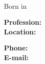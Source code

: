 \documentclass{./../lib/resume}
\begin{document}
\iftoggle{Dev}{\par}{}
\noindent\parbox{57mm}
{\parbox{57mm}{\raggedright\Huge\bfseries\color{cyan}\fullName}\\\parbox{57mm}{\centering Born in \bornData}}\quad\quad\parbox{62mm}
{\textbf{Profession:} \ProfessionI\\\textbf{Location:} \fullAddress}\quad\parbox{62mm}
{\textbf{Phone:} \mobilePhoneI\\\textbf{E-mail:} \emailI}

\descriptions

\craft

\workExperience

\teaching

\project

\education

\publication

\LicensesCertifications

\honorsAwards

\training
\end{document}
